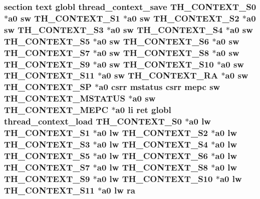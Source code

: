 \hypertarget{riscv_2kpanica_8S_aff57a8987ba7a69637b45e68d8edae4a}{
\subsubsection[{ra}]{\setlength{\rightskip}{0pt plus 5cm}section text globl {\bf thread\-\_\-context\-\_\-save} {\bf T\-H\-\_\-\-C\-O\-N\-T\-E\-X\-T\-\_\-\-S0} $\ast${\bf a0} {\bf sw} {\bf T\-H\-\_\-\-C\-O\-N\-T\-E\-X\-T\-\_\-\-S1} $\ast${\bf a0} {\bf sw} {\bf T\-H\-\_\-\-C\-O\-N\-T\-E\-X\-T\-\_\-\-S2} $\ast${\bf a0} {\bf sw} {\bf T\-H\-\_\-\-C\-O\-N\-T\-E\-X\-T\-\_\-\-S3} $\ast${\bf a0} {\bf sw} {\bf T\-H\-\_\-\-C\-O\-N\-T\-E\-X\-T\-\_\-\-S4} $\ast${\bf a0} {\bf sw} {\bf T\-H\-\_\-\-C\-O\-N\-T\-E\-X\-T\-\_\-\-S5} $\ast${\bf a0} {\bf sw} {\bf T\-H\-\_\-\-C\-O\-N\-T\-E\-X\-T\-\_\-\-S6} $\ast${\bf a0} {\bf sw} {\bf T\-H\-\_\-\-C\-O\-N\-T\-E\-X\-T\-\_\-\-S7} $\ast${\bf a0} {\bf sw} {\bf T\-H\-\_\-\-C\-O\-N\-T\-E\-X\-T\-\_\-\-S8} $\ast${\bf a0} {\bf sw} {\bf T\-H\-\_\-\-C\-O\-N\-T\-E\-X\-T\-\_\-\-S9} $\ast${\bf a0} {\bf sw} {\bf T\-H\-\_\-\-C\-O\-N\-T\-E\-X\-T\-\_\-\-S10} $\ast${\bf a0} {\bf sw} {\bf T\-H\-\_\-\-C\-O\-N\-T\-E\-X\-T\-\_\-\-S11} $\ast${\bf a0} {\bf sw} {\bf T\-H\-\_\-\-C\-O\-N\-T\-E\-X\-T\-\_\-\-R\-A} $\ast${\bf a0} {\bf sw} {\bf T\-H\-\_\-\-C\-O\-N\-T\-E\-X\-T\-\_\-\-S\-P} $\ast${\bf a0} csrr {\bf mstatus} csrr {\bf mepc} {\bf sw} {\bf T\-H\-\_\-\-C\-O\-N\-T\-E\-X\-T\-\_\-\-M\-S\-T\-A\-T\-U\-S} $\ast${\bf a0} {\bf sw} {\bf T\-H\-\_\-\-C\-O\-N\-T\-E\-X\-T\-\_\-\-M\-E\-P\-C} $\ast${\bf a0} {\bf li} ret globl {\bf thread\-\_\-context\-\_\-load} {\bf T\-H\-\_\-\-C\-O\-N\-T\-E\-X\-T\-\_\-\-S0} $\ast${\bf a0} {\bf lw} {\bf T\-H\-\_\-\-C\-O\-N\-T\-E\-X\-T\-\_\-\-S1} $\ast${\bf a0} {\bf lw} {\bf T\-H\-\_\-\-C\-O\-N\-T\-E\-X\-T\-\_\-\-S2} $\ast${\bf a0} {\bf lw} {\bf T\-H\-\_\-\-C\-O\-N\-T\-E\-X\-T\-\_\-\-S3} $\ast${\bf a0} {\bf lw} {\bf T\-H\-\_\-\-C\-O\-N\-T\-E\-X\-T\-\_\-\-S4} $\ast${\bf a0} {\bf lw} {\bf T\-H\-\_\-\-C\-O\-N\-T\-E\-X\-T\-\_\-\-S5} $\ast${\bf a0} {\bf lw} {\bf T\-H\-\_\-\-C\-O\-N\-T\-E\-X\-T\-\_\-\-S6} $\ast${\bf a0} {\bf lw} {\bf T\-H\-\_\-\-C\-O\-N\-T\-E\-X\-T\-\_\-\-S7} $\ast${\bf a0} {\bf lw} {\bf T\-H\-\_\-\-C\-O\-N\-T\-E\-X\-T\-\_\-\-S8} $\ast${\bf a0} {\bf lw} {\bf T\-H\-\_\-\-C\-O\-N\-T\-E\-X\-T\-\_\-\-S9} $\ast${\bf a0} {\bf lw} {\bf T\-H\-\_\-\-C\-O\-N\-T\-E\-X\-T\-\_\-\-S10} $\ast${\bf a0} {\bf lw} {\bf T\-H\-\_\-\-C\-O\-N\-T\-E\-X\-T\-\_\-\-S11} $\ast${\bf a0} {\bf lw} ra}}\label{riscv_2kpanica_8S_aff57a8987ba7a69637b45e68d8edae4a}
